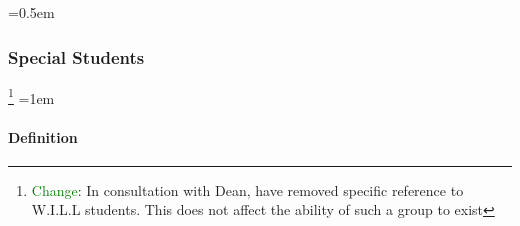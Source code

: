 \documentclass{manual}
\newcommand{\modified}[1]{}
\let\oldsubsubsection\subsubsection
\renewcommand\subsubsection{\leftskip=0.5em\oldsubsubsection}
\let\oldparagraph\paragraph
\renewcommand\paragraph{\leftskip=1em\oldparagraph}
\newcommand{\editRemark}[3]{\textcolor{green}{#2}\footnote{\textcolor{green}{#1}: #3}}
\newcommand{\editRemove}[1]{}
\begin{document}
\editRemove{Entire section on Women in Lifelong Learning}
%
%
%
%
%
%
%
%

\subsubsection{Special Students}\label{sub:SpecialStudents}

\editRemark{Change}{}{In consultation with Dean, have removed specific reference to W.I.L.L students. This does not affect the ability of such a group to exist}
\paragraph{Definition}
\end{document}
